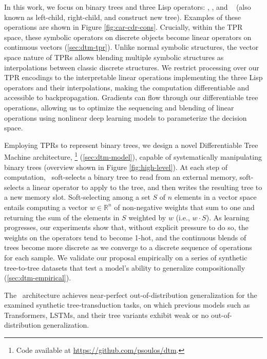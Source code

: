 In this work, we focus on binary trees and three Lisp operators: \car, \cdr, and \cons\ \citep{steele1990common} (also known as left-child, right-child, and construct new tree). Examples of these operations are shown in Figure \ref{fig:car-cdr-cons}. Crucially, within the TPR space, these symbolic operators on discrete objects become linear operators on continuous vectors (\textsection \ref{sec:dtm-tpr}). Unlike normal symbolic structures, the vector space nature of TPRs allows blending multiple symbolic structures as interpolations between classic discrete structures. We restrict processing over our TPR encodings to the interpretable linear operations implementing the three Lisp operators and their interpolations, making the computation differentiable and accessible to backpropagation. Gradients can flow through our differentiable tree operations, allowing us to optimize the sequencing and blending of linear operations using nonlinear deep learning models to parameterize the decision space.

Employing TPRs to represent binary trees, we design a novel Differentiable Tree Machine architecture, \blackboard\footnote{Code available at \url{https://github.com/psoulos/dtm}.} (\textsection \ref{sec:dtm-model}), capable of systematically manipulating binary trees (overview shown in Figure \ref{fig:high-level}). At each step of computation, \blackboard\ soft-selects a binary tree to read from an external memory, soft-selects a linear operator to apply to the tree, and then writes the resulting tree to a new memory slot. Soft-selecting among a set $S$ of $n$ elements in a vector space entails computing a vector $w \in \mathbb{R}^n$ of non-negative weights that sum to one and returning the sum of the elements in $S$ weighted by $w$ (i.e., $w \cdot S$). As learning progresses, our experiments show that, without explicit pressure to do so, the weights on the operators tend to become 1-hot, and the continuous blends of trees become more discrete as we converge to a discrete sequence of operations for each sample. We validate our proposal empirically on a series of synthetic tree-to-tree datasets that test a model's ability to generalize compositionally (\textsection \ref{sec:dtm-empirical}).


The \blackboard\ architecture achieves near-perfect out-of-distribution generalization for the examined synthetic tree-transduction tasks, on which previous models such as Transformers, LSTMs, and their tree variants exhibit weak or no out-of-distribution generalization. 

